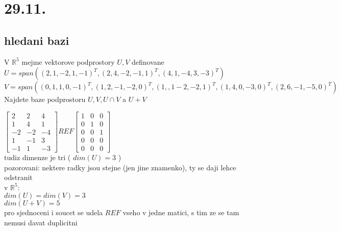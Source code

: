 \documentclass[a4paper]{article}
\begin{document}
\section{29.11.}
\subsection{hledani bazi}

V $\mathbb{R}^5$ mejme vektorove podprostory $U, V$ definovane\\
$U=span({(2,1,-2,1,-1)^T,(2, 4, -2, -1, 1)^T,(4, 1, -4, 3, -3)^T})$
\\
$V=span({
	(0,1,1,0,-1)^T,
	(1, 2, -1, -2, 0)^T,
	(1, ,1 -2, -2, 1)^T,
	(1, 4, 0, -3, 0)^T,
	(2, 6, -1, -5, 0)^T
})$
\\
Najdete baze podprostoru $U, V, U \cap V$ a $U+V$

$
\begin{bmatrix}
	2 & 2 & 4 \\
	1 & 4 & 1 \\
	-2 & -2 & -4 \\
	1 & -1 & 3 \\
	-1 & 1 & -3 
\end{bmatrix}
REF
\begin{bmatrix}
	1 & 0 & 0 \\
	0 & 1 & 0 \\
	0 & 0 & 1 \\
	0 & 0 & 0 \\
	0 & 0 & 0
\end{bmatrix}
$\\
tudiz dimenze je tri ( $dim(U)=3$ ) \\
pozorovani: nektere radky jsou stejne (jen jine znamenko), ty se daji lehce odstranit
\\

\noindent v $\mathbb{R}^5$: \\
$dim(U)=dim(V)=3$ \\
$dim(U+V)=5$ \\
pro sjednoceni i soucet se udela $REF$ vseho v jedne matici, s tim ze se tam nemusi davat duplicitni 
\\
\end{document}
